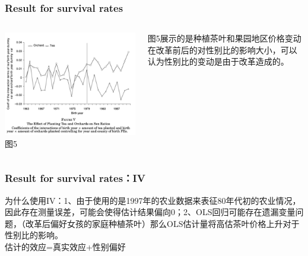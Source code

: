 \documentclass{beamer}
\begin{document}
\begin{frame}
    \frametitle{Result for survival rates}
    \begin{columns}
            \begin{minipage}[c][0.4\textheight][c]{\linewidth}
                \centering
                \includegraphics[scale=0.3]{figure5}
            图5
            \end{minipage}
            \begin{minipage}[c][0.4\textheight][c]{\linewidth}
            图5展示的是种植茶叶和果园地区价格变动在改革前后的对性别比的影响大小，可以认为性别比的变动是由于改革造成的。
            \end{minipage}
    \end{columns} 
\end{frame}


\begin{frame}
    \frametitle{Result for survival rates：IV}
为什么使用IV：1、由于使用的是1997年的农业数据来表征80年代初的农业情况，因此存在测量误差，可能会使得估计结果偏向0；2、OLS回归可能存在遗漏变量问题，（改革后偏好女孩的家庭种植茶叶）那么OLS估计量将高估茶叶价格上升对于性别比的影响。
            \\ 估计的效应=真实效应+性别偏好
\end{frame}
\end{document}
